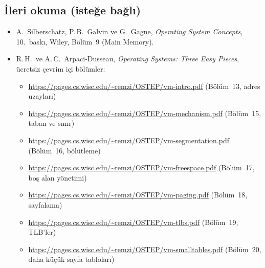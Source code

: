 \subsection*{İleri okuma (isteğe bağlı)}
\begin{itemize}
  \item A.\ Silberschatz, P.\,B.\ Galvin ve G.\ Gagne, \emph{Operating System Concepts}, 10.\ baskı, Wiley, Bölüm~9 (Main Memory).
  \item R.\,H.\ ve A.\,C.\ Arpaci-Dusseau, \emph{Operating Systems: Three Easy Pieces}, ücretsiz çevrim içi bölümler:
  \begin{itemize}
    \item \url{https://pages.cs.wisc.edu/~remzi/OSTEP/vm-intro.pdf} (Bölüm~13, adres uzayları)
    \item \url{https://pages.cs.wisc.edu/~remzi/OSTEP/vm-mechanism.pdf} (Bölüm~15, taban ve sınır)
    \item \url{https://pages.cs.wisc.edu/~remzi/OSTEP/vm-segmentation.pdf} (Bölüm~16, bölütleme)
    \item \url{https://pages.cs.wisc.edu/~remzi/OSTEP/vm-freespace.pdf} (Bölüm~17, boş alan yönetimi)
    \item \url{https://pages.cs.wisc.edu/~remzi/OSTEP/vm-paging.pdf} (Bölüm~18, sayfalama)
    \item \url{https://pages.cs.wisc.edu/~remzi/OSTEP/vm-tlbs.pdf} (Bölüm~19, TLB'ler)
    \item \url{https://pages.cs.wisc.edu/~remzi/OSTEP/vm-smalltables.pdf} (Bölüm~20, daha küçük sayfa tabloları)
  \end{itemize}
\end{itemize}
